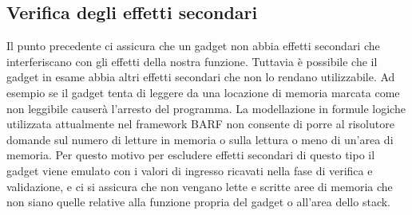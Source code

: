 

\subsection{Verifica degli effetti secondari}  

Il punto precedente ci assicura che un gadget non abbia effetti
secondari che interferiscano con gli effetti della nostra
funzione. Tuttavia è possibile che il gadget in esame abbia altri
effetti secondari che non lo rendano utilizzabile. Ad esempio se il
gadget tenta di leggere da una locazione di memoria marcata come non
leggibile causerà l'arresto del programma. La modellazione in formule
logiche utilizzata attualmente nel framework BARF non consente di
porre al risolutore domande sul numero di letture in memoria o sulla
lettura o meno di un'area di memoria. Per questo motivo per escludere
effetti secondari di questo tipo il gadget viene emulato con i valori
di ingresso ricavati nella fase di verifica e validazione, e ci si
assicura che non vengano lette e scritte aree di memoria che non siano
quelle relative alla funzione propria del gadget o all'area dello
stack.


